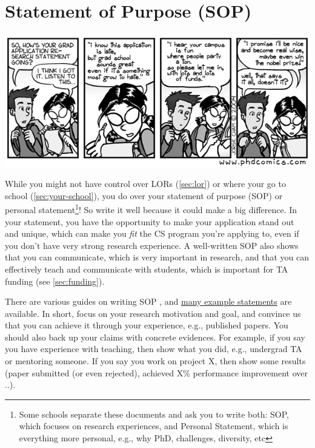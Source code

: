 \documentclass[oneside,11pt,dvipsnames]{book}
\begin{document}
\section{Statement of Purpose (SOP)}\label{sec:research-statement}

\begin{center}
  \includegraphics[scale=0.4]{files/c2.png}
\end{center}

While you might not have control over LORs (\autoref{sec:lor}) or where your go to school (\autoref{sec:your-school}), you do over your
statement of purpose (SOP) or personal statement\footnote{Some schools separate these documents and ask you to write both: SOP, which focuses on research experiences, and Personal Statement, which is everything more personal, e.g., why PhD, challenges, diversity, etc}! So write it well because it could make a big difference.
In your statement, you have the opportunity to make your application stand out and unique, which can make you \emph{fit} the CS program you're applying to, even if you don't have very strong research experience.
A well-written SOP also shows that you can communicate, which is very important in research, and that you can effectively teach and communicate with students, which is important for TA funding (see \autoref{sec:funding}).

There are various guides on writing SOP , and \href{https://cs-sop.org/}{many example statements} are available. In short, focus on your research motivation and goal, and convince us that you can achieve it through your experience, e.g., published papers. You should also back up your claims with concrete evidences. For example, if you say you have experience with teaching, then show what you did, e.g., undergrad TA or mentoring someone.  If you say you work on project X, then show some results (paper submitted (or even rejected), achieved X\% performance improvement over ..).
\end{document}
